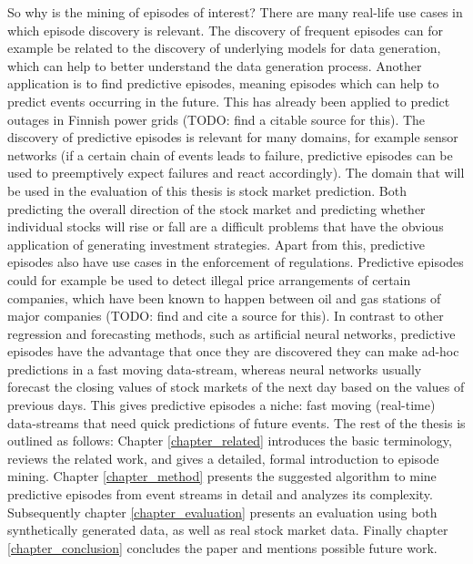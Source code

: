 So why is the mining of episodes of interest? There are many real-life use cases in which episode discovery is relevant. The discovery of frequent episodes can for example be related to the discovery of underlying models for data generation, which can help to better understand the data generation process. Another application is to find predictive episodes, meaning episodes which can help to predict events occurring in the future. This has already been applied to predict outages in Finnish power grids (TODO: find a citable source for this). The discovery of predictive episodes is relevant for many domains, for example sensor networks (if a certain chain of events leads to failure, predictive episodes can be used to preemptively expect failures and react accordingly). The domain that will be used in the evaluation of this thesis is stock market prediction. Both predicting the overall direction of the stock market and predicting whether individual stocks will rise or fall are a difficult problems that have the obvious application of generating investment strategies. Apart from this, predictive episodes also have use cases in the enforcement of regulations. Predictive episodes could for example be used to detect illegal price arrangements of certain companies, which have been known to happen between oil and gas stations of major companies (TODO: find and cite a source for this). \newline
In contrast to other regression and forecasting methods, such as artificial neural networks, predictive episodes have the advantage that once they are discovered they can make ad-hoc predictions in a fast moving data-stream, whereas neural networks usually forecast the closing values of stock markets of the next day based on the values of previous days. This gives predictive episodes a niche: fast moving (real-time) data-streams that need quick predictions of future events. \newline
The rest of the thesis is outlined as follows: Chapter \ref{chapter_related} introduces the basic terminology, reviews the related work, and gives a detailed, formal introduction to episode mining. Chapter \ref{chapter_method} presents the suggested algorithm to mine predictive episodes from event streams in detail and analyzes its complexity. Subsequently chapter \ref{chapter_evaluation} presents an evaluation using both synthetically generated data, as well as real stock market data. Finally chapter \ref{chapter_conclusion} concludes the paper and mentions possible future work.

